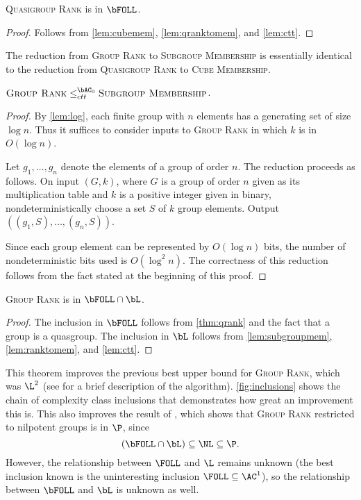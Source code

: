\documentclass{article}
\begin{document}
\begin{theorem}\label{thm:qrank}
  \textsc{Quasigroup Rank} is in $\bFOLL$.
\end{theorem}
\begin{proof}
  Follows from \autoref{lem:cubemem}, \autoref{lem:qranktomem}, and \autoref{lem:ctt}.
\end{proof}

The reduction from \textsc{Group Rank} to \textsc{Subgroup Membership} is essentially identical to the reduction from \textsc{Quasigroup Rank} to \textsc{Cube Membership}.

\begin{lemma}\label{lem:ranktomem}
  $\textsc{Group Rank} \leq^{\bAC_0}_{ctt} \textsc{Subgroup Membership}$.
\end{lemma}
\begin{proof}
  By \autoref{lem:log}, each finite group with $n$ elements has a generating set of size $\log n$.
  Thus it suffices to consider inputs to \textsc{Group Rank} in which $k$ is in $O(\log n)$.

  Let $g_1, \dotsc, g_n$ denote the elements of a group of order $n$.
  The reduction proceeds as follows.
  On input $(G, k)$, where $G$ is a group of order $n$ given as its multiplication table and $k$ is a positive integer given in binary, nondeterministically choose a set $S$ of $k$ group elements.
  Output $((g_1, S), \dotsc, (g_n, S))$.

  Since each group element can be represented by $O(\log n)$ bits, the number of nondeterministic bits used is $O(\log^2 n)$.
  The correctness of this reduction follows from the fact stated at the beginning of this proof.
\end{proof}

\begin{theorem}
  \textsc{Group Rank} is in $\bFOLL \cap \bL$.
\end{theorem}
\begin{proof}
  The inclusion in $\bFOLL$ follows from \autoref{thm:qrank} and the fact that a group is a quasgroup.
  The inclusion in $\bL$ follows from \autoref{lem:subgroupmem}, \autoref{lem:ranktomem}, and \autoref{lem:ctt}.
\end{proof}

This theorem improves the previous best upper bound for \textsc{Group Rank}, which was $\L^2$ \cite{lsz77} (see \cite[Proposition~3]{at06} for a brief description of the algorithm).
\autoref{fig:inclusions} shows the chain of complexity class inclusions that demonstrates how great an improvement this is.
This also improves the result of \cite[Theorem~7]{at06}, which shows that \textsc{Group Rank} restricted to nilpotent groups is in $\P$, since
\begin{equation*}
  (\bFOLL \cap \bL) \subseteq \NL \subseteq \P.
\end{equation*}
However, the relationship between $\FOLL$ and $\L$ remains unknown (the best inclusion known is the uninteresting inclusion $\FOLL \subseteq \AC^1$), so the relationship between $\bFOLL$ and $\bL$ is unknown as well.
\end{document}
